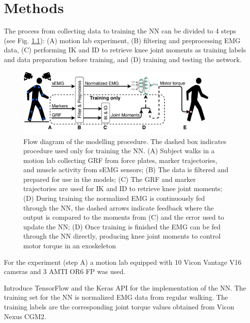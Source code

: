 \documentclass[../main.tex]{subfiles}
\begin{document}
\chapter{Methods}
The process from collecting data to training the \ac{NN} can be divided to 4 steps (see Fig. \ref{fig:process-diagram}): (A) motion lab experiment, (B) filtering and preprocessing EMG data, (C) performing \ac{IK} and \ac{ID} to retrieve knee joint moments as training labels and data preparation before training, and (D) training and testing the network.

\begin{figure}[ht]
    \centering
    \includegraphics[width=0.9\textwidth]{img/ProcessDiagram}
    \caption{Flow diagram of the modelling procedure. The dashed box indicates procedure used only for training the \ac{NN}. (A) Subject walks in a motion lab collecting \ac{GRF} from force plates, marker trajectories, and muscle activity from \ac{sEMG} sensors; (B) The data is filtered and prepared for use in the models; (C) The \ac{GRF} and marker trajectories are used for \ac{IK} and \ac{ID} to retrieve knee joint moments; (D) During training the normalized \ac{EMG} is continuously fed through the \ac{NN}, the dashed arrows indicate feedback where the output is compared to the moments from (C) and the error used to update the \ac{NN}; (D) Once training is finished the \ac{EMG} can be fed through the \ac{NN} directly, producing knee joint moments to control motor torque in an exoskeleton}
    \label{fig:process-diagram}
\end{figure}

For the experiment (step A) a motion lab equipped with 10 Vicon Vantage V16 cameras and 3 AMTI OR6 \ac{FP} was used. 


Introduce TensorFlow and the Keras API for the implementation of the \ac{NN}.
The training set for the \ac{NN} is normalized EMG data from regular walking.
The training labels are the corresponding joint torque values obtained from Vicon Nexus CGM2.
\end{document}
